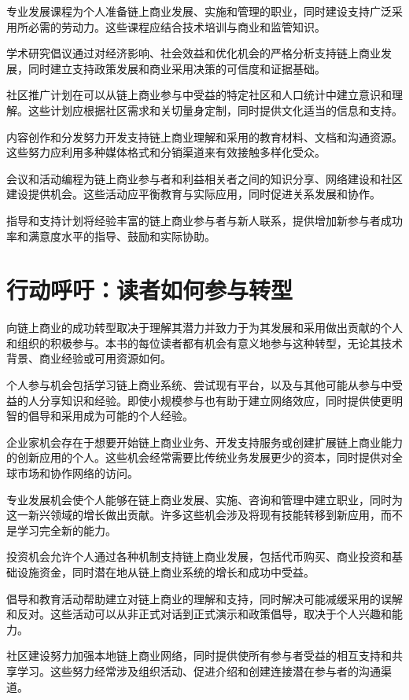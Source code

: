 \documentclass[
  Letterpaper,
]{scrbook}
\begin{document}
专业发展课程为个人准备链上商业发展、实施和管理的职业，同时建设支持广泛采用所必需的劳动力。这些课程应结合技术培训与商业和监管知识。

学术研究倡议通过对经济影响、社会效益和优化机会的严格分析支持链上商业发展，同时建立支持政策发展和商业采用决策的可信度和证据基础。

社区推广计划在可以从链上商业参与中受益的特定社区和人口统计中建立意识和理解。这些计划应根据社区需求和关切量身定制，同时提供文化适当的信息和支持。

内容创作和分发努力开发支持链上商业理解和采用的教育材料、文档和沟通资源。这些努力应利用多种媒体格式和分销渠道来有效接触多样化受众。

会议和活动编程为链上商业参与者和利益相关者之间的知识分享、网络建设和社区建设提供机会。这些活动应平衡教育与实际应用，同时促进关系发展和协作。

指导和支持计划将经验丰富的链上商业参与者与新人联系，提供增加新参与者成功率和满意度水平的指导、鼓励和实际协助。

\section{行动呼吁：读者如何参与转型}\label{ux884cux52a8ux547cux5401ux8bfbux8005ux5982ux4f55ux53c2ux4e0eux8f6cux578b}

向链上商业的成功转型取决于理解其潜力并致力于为其发展和采用做出贡献的个人和组织的积极参与。本书的每位读者都有机会有意义地参与这种转型，无论其技术背景、商业经验或可用资源如何。

个人参与机会包括学习链上商业系统、尝试现有平台，以及与其他可能从参与中受益的人分享知识和经验。即使小规模参与也有助于建立网络效应，同时提供使更明智的倡导和采用成为可能的个人经验。

企业家机会存在于想要开始链上商业业务、开发支持服务或创建扩展链上商业能力的创新应用的个人。这些机会经常需要比传统业务发展更少的资本，同时提供对全球市场和协作网络的访问。

专业发展机会使个人能够在链上商业发展、实施、咨询和管理中建立职业，同时为这一新兴领域的增长做出贡献。许多这些机会涉及将现有技能转移到新应用，而不是学习完全新的能力。

投资机会允许个人通过各种机制支持链上商业发展，包括代币购买、商业投资和基础设施资金，同时潜在地从链上商业系统的增长和成功中受益。

倡导和教育活动帮助建立对链上商业的理解和支持，同时解决可能减缓采用的误解和反对。这些活动可以从非正式对话到正式演示和政策倡导，取决于个人兴趣和能力。

社区建设努力加强本地链上商业网络，同时提供使所有参与者受益的相互支持和共享学习。这些努力经常涉及组织活动、促进介绍和创建连接潜在参与者的沟通渠道。
\end{document}
